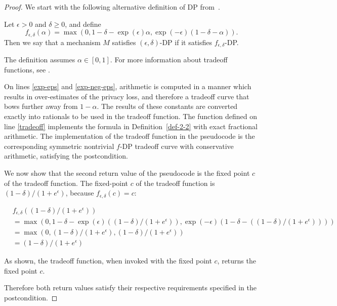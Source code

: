 \documentclass{article}
\begin{document}
\begin{proof} 
    We start with the following alternative definition of DP from~\cite{awan2023canonical}.
\begin{definition}
    \label{def-2-2}
    Let $\epsilon > 0$ and $\delta \geq 0$, and define 
    \begin{equation}
        f_{\epsilon,\delta}(\alpha) = \max(0, 1 - \delta - \exp(\epsilon) \alpha, \exp(-\epsilon) (1 - \delta - \alpha)).
    \end{equation}
    Then we say that a mechanism $M$ satisfies $(\epsilon, \delta)$-DP if it satisfies $f_{\epsilon,\delta}$-DP.
\end{definition}
The definition assumes $\alpha \in [0, 1]$.
For more information about tradeoff functions, see \cite{awan2023canonical}.

On lines \ref{exp-eps} and \ref{exp-neg-eps}, 
arithmetic is computed in a manner which results in over-estimates of the privacy loss, 
and therefore a tradeoff curve that bows further away from $1 - \alpha$.
The results of these constants are converted exactly into rationals to be used in the tradeoff function.
The function defined on line \ref{tradeoff} implements the formula in Definition~\ref{def-2-2} with exact fractional arithmetic.
The implementation of the tradeoff function in the pseudocode is the corresponding symmetric nontrivial $f$-DP tradeoff curve with conservative arithmetic,
satisfying the postcondition.

We now show that the second return value of the pseudocode is the fixed point $c$ of the tradeoff function.
The fixed-point $c$ of the tradeoff function is $(1 - \delta) / (1 + e^\epsilon)$, because $f_{\epsilon,\delta}(c) = c$:

\begin{align}
    &f_{\epsilon,\delta}((1 - \delta) / (1 + e^\epsilon)) \\
    &= \max(0, 1 - \delta - \exp(\epsilon) ((1 - \delta) / (1 + e^\epsilon)), \exp(-\epsilon) (1 - \delta - ((1 - \delta) / (1 + e^\epsilon)))) \\
    &= \max(0, (1 - \delta) / (1 + e^\epsilon), (1 - \delta) / (1 + e^\epsilon)) \\
    &= (1 - \delta) / (1 + e^\epsilon)
\end{align}

As shown, the tradeoff function, when invoked with the fixed point $c$, returns the fixed point $c$.

Therefore both return values satisfy their respective requirements specified in the postcondition.
\end{proof}

\printbibliography
\end{document}
